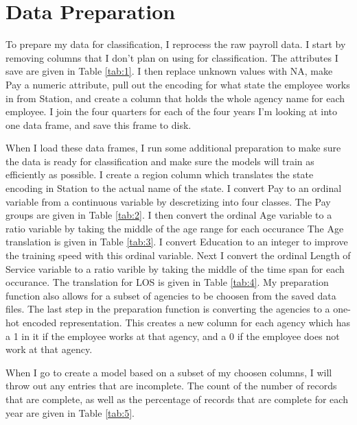 \documentclass{article}
\begin{document}
\section{Data Preparation}
To prepare my data for classification, I reprocess the raw payroll data. I start by removing columns that I don't plan on using for classification. The attributes I save are given in Table \ref{tab:1}. I then replace unknown values with NA, make Pay a numeric attribute, pull out the encoding for what state the employee works in from Station, and create a column that holds the whole agency name for each employee. I join the four quarters for each of the four years I'm looking at into one data frame, and save this frame to disk.
\par
When I load these data frames, I run some additional preparation to make sure the data is ready for classification and make sure the models will train as efficiently as possible. I create a region column which translates the state encoding in Station to the actual name of the state. I convert Pay to an ordinal variable from a continuous variable by descretizing into four classes. The Pay groups are given in Table \ref{tab:2}. I then convert the ordinal Age variable to a ratio variable by taking the middle of the age range for each occurance The Age translation is given in Table \ref{tab:3}. I convert Education to an integer to improve the training speed with this ordinal variable. Next I convert the ordinal Length of Service variable to a ratio varible by taking the middle of the time span for each occurance. The translation for LOS is given in Table \ref{tab:4}. My preparation function also allows for a subset of agencies to be choosen from the saved data files. The last step in the preparation function is converting the agencies to a one-hot encoded representation. This creates a new column for each agency which has a 1 in it if the employee works at that agency, and a 0 if the employee does not work at that agency.
\par
When I go to create a model based on a subset of my choosen columns, I will throw out any entries that are incomplete. The count of the number of records that are complete, as well as the percentage of records that are complete for each year are given in Table \ref{tab:5}.
\end{document}
